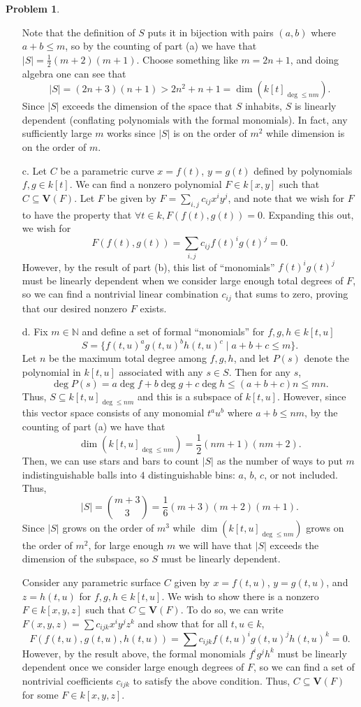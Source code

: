 \documentclass[12pt]{amsart}
\theoremstyle{definition}
\newtheorem{prob}{Problem}
\begin{document}
\begin{flushleft}
\begin{prob}
\begin{enumerate}
    Note that the definition of $S$ puts it in bijection with pairs $(a,b)$ where $a+b\le m$, so by the counting of part (a) we have that $|S| = \frac{1}{2}(m+2)(m+1)$. Choose something like $m =2n+1$, and doing algebra one can see that \[|S| = (2n+3)(n+1)> 2n^2 + n +1=\dim(k[t]_{\deg\le nm}).\] 
    Since $|S|$ exceeds the dimension of the space that $S$ inhabits, $S$ is linearly dependent (conflating polynomials with the formal monomials). In  fact, any sufficiently large $m$ works since $|S|$ is on the order of $m^2$ while dimension is on the order of $m$.
    \item[c.] Let $C$ be a parametric curve $x=f(t)$, $y=g(t)$ defined by polynomials $f,g\in k[t]$. We can find a nonzero polynomial $F \in k[x,y]$ such that $C \subseteq \mathbf V(F)$. Let $F$ be given by 
    $F = \sum_{i,j} c_{ij} x^i y^j$, and note that we wish for $F$ to have the property that $\forall t \in k, F(f(t),g(t))=0$. Expanding this out, we wish for
    \[F(f(t),g(t)) = \sum_{i,j} c_{ij} f(t)^ig(t)^j=0.\]
    However, by the result of part (b), this list of ``monomials'' $f(t)^i g(t)^j$ must be linearly dependent when we consider large enough total degrees of $F$, so we can find a nontrivial linear combination $c_{ij}$ that sums to zero, proving that our desired nonzero $F$ exists.
    \item[d.] Fix $m \in \mathbb N$ and define a set of formal ``monomials'' for $f,g,h\in k[t,u]$
    \[
    S = \{f(t,u)^ag(t,u)^bh(t,u)^c \mid a+b+ c \le m\}.
    \]
    Let $n$ be the maximum total degree among $f,g,h$, and let $P(s)$ denote the polynomial in $k[t,u]$ associated with any $s \in S$. Then for any $s$,
    \[
    \deg P(s) = a\deg f+b\deg g + c\deg h \le (a+b+c)n\le mn.
    \]
    Thus, $S\subseteq k[t,u]_{\deg \le nm}$ and this is a subspace of $k[t,u]$. However, since this vector space consists of any monomial $t^au^b$ where $a+b\le nm$, by the counting of part (a) we have that \[\dim(k[t,u]_{\deg \le nm})= \frac{1}{2}(nm+1)(nm+2).\] 
    Then, we can use stars and bars to count $|S|$ as the number of ways to put $m$ indistinguishable balls into $4$ distinguishable bins: $a$, $b$, $c$, or not included. Thus, \[|S| = \binom{m+3}{3} = \frac{1}{6}(m+3)(m+2)(m+1).\]
    Since $|S|$ grows on the order of $m^3$ while $\dim(k[t,u]_{\deg\le nm})$ grows on the order of $m^2$, for large enough $m$ we will have that $|S|$ exceeds the dimension of the subspace, so $S$ must be linearly dependent. 

    Consider any parametric surface $C$ given by $x = f(t,u)$, $y = g(t,u)$, and $z = h(t,u)$ for $f,g,h \in k[t,u]$. We wish to show there is a nonzero $F \in k[x,y,z]$ such that $C\subseteq \mathbf V(F)$. To do so, we can write $F(x,y,z) = \sum c_{ijk} x^iy^jz^k$ and show that for all $t,u\in k$, \[
    F(f(t,u),g(t,u),h(t,u)) = \sum c_{ijk} f(t,u)^i g(t,u)^j h(t,u)^k = 0.
    \]
    However, by the result above, the formal monomials $f^i g^j h^k$ must be linearly dependent once we consider large enough degrees of $F$, so we can find a set of nontrivial coefficients $c_{ijk}$ to satisfy the above condition. Thus, $C \subseteq \mathbf V(F)$ for some $F \in k[x,y,z]$.
\end{enumerate}


\end{prob}
\end{flushleft}
\end{document}
